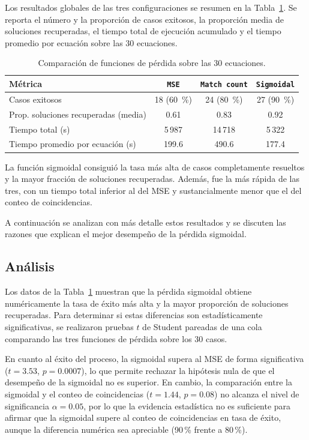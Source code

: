 Los resultados globales de las tres configuraciones se resumen en la Tabla~\ref{tab:comparacion_perdida}. Se reporta el número y la proporción de casos exitosos, la proporción media de soluciones recuperadas, el tiempo total de ejecución acumulado y el tiempo promedio por ecuación sobre las 30 ecuaciones.

\begin{table}[H] \centering \caption{Comparación de funciones de pérdida sobre las 30 ecuaciones.} \label{tab:comparacion_perdida} \begin{tabular}{lccc} \hline
Métrica & \texttt{MSE} & \texttt{Match count} & \texttt{Sigmoidal} \\
\hline
Casos exitosos & 18 (60~\%) & 24 (80~\%) & 27 (90~\%) \\
Prop. soluciones recuperadas (media) & 0.61 & 0.83 & 0.92 \\
Tiempo total (s) & 5\,987 & 14\,718 & 5\,322 \\
Tiempo promedio por ecuación (s) & 199.6 & 490.6 & 177.4 \\
\hline \end{tabular} \end{table}

La función sigmoidal consiguió la tasa más alta de casos completamente resueltos y la mayor fracción de soluciones recuperadas. Además, fue la más rápida de las tres, con un tiempo total inferior al del MSE y sustancialmente menor que el del conteo de coincidencias.

A continuación se analizan con más detalle estos resultados y se discuten las razones que explican el mejor desempeño de la pérdida sigmoidal.

\subsection{Análisis}

Los datos de la Tabla~\ref{tab:comparacion_perdida} muestran que la pérdida sigmoidal obtiene numéricamente la tasa de éxito más alta y la mayor proporción de soluciones recuperadas. Para determinar si estas diferencias son estadísticamente significativas, se realizaron pruebas $t$ de Student pareadas de una cola comparando las tres funciones de pérdida sobre los 30 casos.

En cuanto al éxito del proceso, la sigmoidal supera al MSE de forma significativa ($t = 3.53$, $p = 0.0007$), lo que permite rechazar la hipótesis nula de que el desempeño de la sigmoidal no es superior. En cambio, la comparación entre la sigmoidal y el conteo de coincidencias ($t = 1.44$, $p = 0.08$) no alcanza el nivel de significancia $\alpha = 0.05$, por lo que la evidencia estadística no es suficiente para afirmar que la sigmoidal supere al conteo de coincidencias en tasa de éxito, aunque la diferencia numérica sea apreciable (90\,\% frente a 80\,\%).

